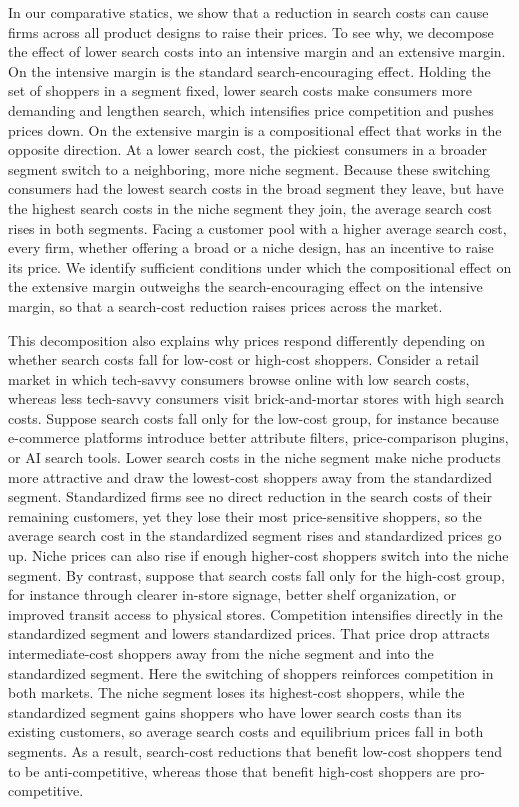 \documentclass[14pt]{article}
\theoremstyle{plain}
\theoremstyle{definition}
\theoremstyle{remark}
\DeclareRobustCommand\1{\futurelet\oneNext\oneCheck}
\begin{document}
In our comparative statics, we show that a reduction in search costs can cause firms across all product designs to raise their prices. To see why, we decompose the effect of lower search costs into an intensive margin and an extensive margin. On the intensive margin is the standard search-encouraging effect. Holding the set of shoppers in a segment fixed, lower search costs make consumers more demanding and lengthen search, which intensifies price competition and pushes prices down. On the extensive margin is a compositional effect that works in the opposite direction. At a lower search cost, the pickiest consumers in a broader segment switch to a neighboring, more niche segment. Because these switching consumers had the lowest search costs in the broad segment they leave, but have the highest search costs in the niche segment they join, the average search cost rises in both segments. Facing a customer pool with a higher average search cost, every firm, whether offering a broad or a niche design, has an incentive to raise its price. We identify sufficient conditions under which the compositional effect on the extensive margin outweighs the search-encouraging effect on the intensive margin, so that a search-cost reduction raises prices across the market.

This decomposition also explains why prices respond differently depending on whether search costs fall for low-cost or high-cost shoppers. Consider a retail market in which tech-savvy consumers browse online with low search costs, whereas less tech-savvy consumers visit brick-and-mortar stores with high search costs. Suppose search costs fall only for the low-cost group, for instance because e-commerce platforms introduce better attribute filters, price-comparison plugins, or AI search tools. Lower search costs in the niche segment make niche products more attractive and draw the lowest-cost shoppers away from the standardized segment. Standardized firms see no direct reduction in the search costs of their remaining customers, yet they lose their most price-sensitive shoppers, so the average search cost in the standardized segment rises and standardized prices go up. Niche prices can also rise if enough higher-cost shoppers switch into the niche segment. By contrast, suppose that search costs fall only for the high-cost group, for instance through clearer in-store signage, better shelf organization, or improved transit access to physical stores. Competition intensifies directly in the standardized segment and lowers standardized prices. That price drop attracts intermediate-cost shoppers away from the niche segment and into the standardized segment. Here the switching of shoppers reinforces competition in both markets. The niche segment loses its highest-cost shoppers, while the standardized segment gains shoppers who have lower search costs than its existing customers, so average search costs and equilibrium prices fall in both segments. As a result, search-cost reductions that benefit low-cost shoppers tend to be anti-competitive, whereas those that benefit high-cost shoppers are pro-competitive.
\end{document}
